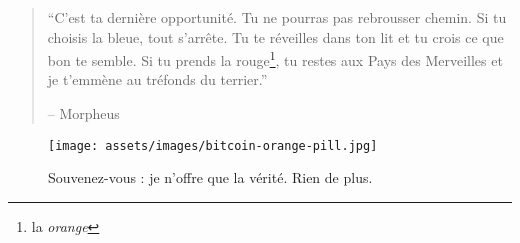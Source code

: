 \begin{quotation}\begin{samepage}
\enquote{C'est ta dernière opportunité. Tu ne pourras pas rebrousser chemin. Si
tu choisis la bleue, tout s'arrête. Tu te réveilles dans ton lit et tu crois ce
que bon te semble. Si tu prends la rouge\footnote{la \textit{orange}}, tu restes
aux Pays des Merveilles et je t'emmène au tréfonds du terrier.}
\begin{flushright} -- Morpheus
\end{flushright}\end{samepage}\end{quotation}

\begin{figure}
  \texttt{[image: assets/images/bitcoin-orange-pill.jpg]}
  \caption{Souvenez-vous : je n'offre que la vérité. Rien de plus.}
  \label{fig:bitcoin-orange-pill}
\end{figure}

%
%
%
